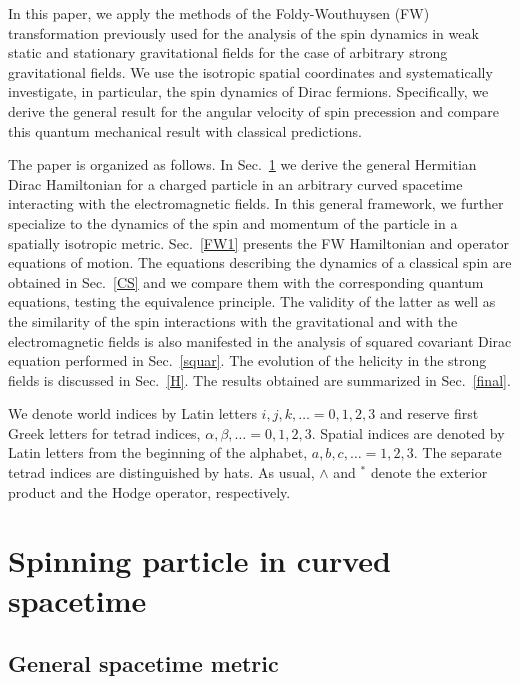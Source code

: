 \documentclass[preprint,showpacs,preprintnumbers,eqsecnum,amsmath,amssymb]{revtex4}
\begin{document}
In this paper, we apply the methods of the Foldy-Wouthuysen (FW)
transformation previously used for the analysis of the spin
dynamics in weak static and stationary gravitational fields
\cite{PRD,PRD2,Warszawa,OST} for the case of arbitrary strong
gravitational fields. We use the isotropic spatial coordinates and
systematically investigate, in particular, the spin dynamics of
Dirac fermions. Specifically, we derive the general result for the
angular velocity of spin precession and compare this quantum
mechanical result with classical predictions.

The paper is organized as follows. In Sec.~\ref{Hamiltonian} we
derive the general Hermitian Dirac Hamiltonian for a charged particle in
an arbitrary curved spacetime interacting with the electromagnetic fields.
In this general framework, we further specialize to the dynamics
of the spin and momentum of the particle in a spatially isotropic
metric. Sec.~\ref{FW1} presents the FW Hamiltonian and operator
equations of motion. The equations describing the dynamics of a
classical spin are obtained in Sec.~\ref{CS} and we compare them
with the corresponding quantum equations, testing the equivalence
principle. The validity of the latter as well as the similarity of
the spin interactions with the gravitational and with the
electromagnetic fields is also manifested in the analysis of
squared covariant Dirac equation performed in Sec.~\ref{squar}.
The evolution of the helicity in the strong fields is discussed in
Sec.~\ref{H}. The results obtained are summarized in Sec.~\ref{final}.

We denote world indices by Latin letters $i,j,k,\ldots = 0,1,2,3$
and reserve first Greek letters for tetrad indices,
$\alpha,\beta,\ldots = 0,1,2,3$. Spatial indices are denoted by
Latin letters from the beginning of the alphabet, $a,b,c,\ldots =
1,2,3$. The separate tetrad indices are distinguished by hats. As
usual, $\wedge$ and $^\ast$ denote the exterior product and the
Hodge operator, respectively.


\section{Spinning particle in curved spacetime}\label{Hamiltonian}

\subsection{General spacetime metric}
\end{document}
